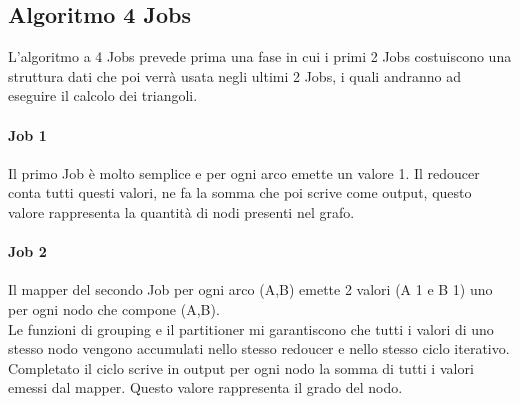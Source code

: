 \documentclass[paper=a4, fontsize=11pt]{scrartcl}	%
\numberwithin{equation}{section}															%
\numberwithin{figure}{section}																%
\numberwithin{table}{section}																%
\begin{document}
\subsection{Algoritmo 4 Jobs}
L'algoritmo a 4 Jobs prevede prima una fase in cui i primi 2 Jobs costuiscono una struttura dati che poi verrà usata negli ultimi 2 Jobs, i quali andranno ad eseguire il calcolo dei triangoli.
\paragraph{Job 1}
Il primo Job è molto semplice e per ogni arco emette un valore 1. Il redoucer conta tutti questi valori, ne fa la somma che poi scrive come output, questo valore rappresenta la quantità di nodi presenti nel grafo.
\paragraph{Job 2}
Il mapper del secondo Job per ogni arco (A,B) emette 2 valori (A 1 e B 1) uno per ogni nodo che compone (A,B).\\
Le funzioni di grouping e il partitioner mi garantiscono che tutti i valori di uno stesso nodo vengono accumulati nello stesso redoucer e nello stesso ciclo iterativo. Completato il ciclo scrive in output per ogni nodo la somma di tutti i valori emessi dal mapper. Questo valore rappresenta il grado del nodo.
\end{document}
